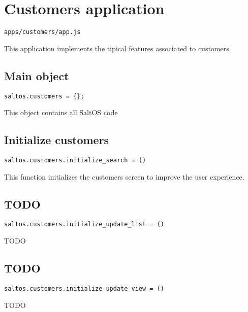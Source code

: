 \documentclass[a4paper]{book}
\begin{document}
\hypertarget{toc504}{}
\section{Customers application}

\begin{lstlisting}
apps/customers/app.js
\end{lstlisting}

This application implements the tipical features associated to customers

\hypertarget{toc505}{}
\subsection{Main object}

\begin{lstlisting}
saltos.customers = {};
\end{lstlisting}

This object contains all SaltOS code

\hypertarget{toc506}{}
\subsection{Initialize customers}

\begin{lstlisting}
saltos.customers.initialize_search = ()
\end{lstlisting}

This function initializes the customers screen to improve the user experience.

\hypertarget{toc507}{}
\subsection{TODO}

\begin{lstlisting}
saltos.customers.initialize_update_list = ()
\end{lstlisting}

TODO

\hypertarget{toc508}{}
\subsection{TODO}

\begin{lstlisting}
saltos.customers.initialize_update_view = ()
\end{lstlisting}

TODO
\end{document}
